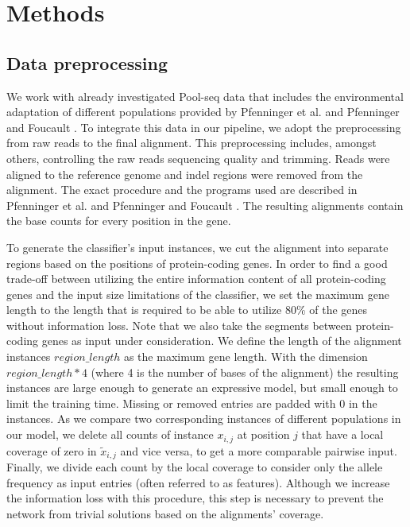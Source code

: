 \documentclass{article}
\begin{document}
\section{Methods}
\label{methods}
\subsection{Data preprocessing}
\label{data_preprocessing}
We work with already investigated Pool-seq data that includes the environmental adaptation of different populations provided by Pfenninger et al. \cite{pfenninger_poecilia} and Pfenninger and Foucault \cite{pfenninger_foucault}. To integrate this data in our pipeline, we adopt the preprocessing from raw reads to the final alignment.
This preprocessing includes, amongst others, controlling the raw reads sequencing quality and trimming. Reads were aligned to the reference genome and indel regions were removed from the alignment. The exact procedure and the programs used are described in Pfenninger et al. \cite{pfenninger_poecilia} and Pfenninger and Foucault \cite{pfenninger_foucault}. The resulting alignments contain the base counts for every position in the gene.

To generate the classifier's input instances, we cut the alignment into separate regions based on the positions of protein-coding genes. In order to find a good trade-off between utilizing the entire information content of all protein-coding genes and the input size limitations of the classifier, we set the maximum gene length to the length that is required to be able to utilize 80\% of the genes without information loss. Note that we also take the segments between protein-coding genes as input under consideration. We define the length of the alignment instances $region\_length$ as the maximum gene length.
With the dimension $region\_length * 4$ (where 4 is the number of bases of the alignment) the resulting instances are large enough to generate an expressive model, but small enough to limit the training time. Missing or removed entries are padded with 0 in the instances. As we compare two corresponding instances of different populations in our model, we delete all counts of instance $x_{i,j}$ at position $j$ that have a local coverage of zero in $\widetilde{x}_{i,j}$ and vice versa, to get a more comparable pairwise input. Finally, we divide each count by the local coverage to consider only the allele frequency as input entries (often referred to as features). Although we increase the information loss with this procedure, this step is necessary to prevent the network from trivial solutions based on the alignments' coverage.
\end{document}
